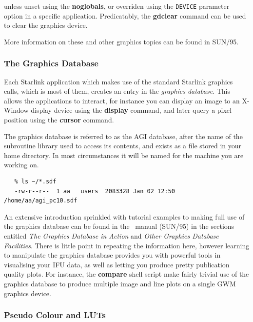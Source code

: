 \documentclass[twoside,11pt]{article}
\newcommand{\xref}[3]{#1}
\begin{document}
\begin{\htmlonly}
{unless unset using the \xref{{\bf noglobals}}{sun95}{NOGLOBALS}, or
overriden using the {\tt DEVICE} parameter option in a specific
application.  Predicatably, the \xref{{\bf gdclear}}{sun95}{GDCLEAR}
command can be used to clear the graphics device.

More information on these and other graphics topics can be found in
\xref{SUN/95}{sun95}{}.

\subsubsection{The Graphics Database}

Each Starlink application which makes use of the standard Starlink
graphics calls, which is most of them, creates an entry in the
{\em graphics database}.  This allows the applications to interact, for
instance you can display an image to an X-Window display device using
the {\bf display} command, and later query a pixel position using the 
{\bf cursor} command.

The graphics database is referred to as the AGI database, after the
name of the \xref{subroutine library}{sun48}{} used to access its
contents, and exists as a file stored in your home directory.  In most
circumstances it will be named for the machine you are working on.

\small\begin{verbatim}
   % ls ~/*.sdf
   -rw-r--r--  1 aa   users  2083328 Jan 02 12:50  /home/aa/agi_pc10.sdf
\end{verbatim}\normalsize

An extensive introduction sprinkled with tutorial examples to making
full use of the \xref{graphics database}{sun95}{se_agitate} can be
found in the \KAPPA\ manual (SUN/95) in the sections entitled
\xref{{\em The Graphics Database in Action}}{sun95}{se_agiaction} and
\xref{{\em Other Graphics Database Facilities}}{sun95}{se_agiother}.
There is little point in repeating the information here, however
learning to manipulate the graphics database provides you with
powerful tools in visualising your IFU data, as well as letting you
produce pretty publication quality plots.  For instance, the \xref{{\bf
compare}}{sun237}{compare} shell script make fairly trivial use of the
graphics database to produce multiple image and line plots on a
single GWM graphics device.

\subsubsection{Pseudo Colour and LUTs}

}
\end{\htmlonly}
\end{document}
